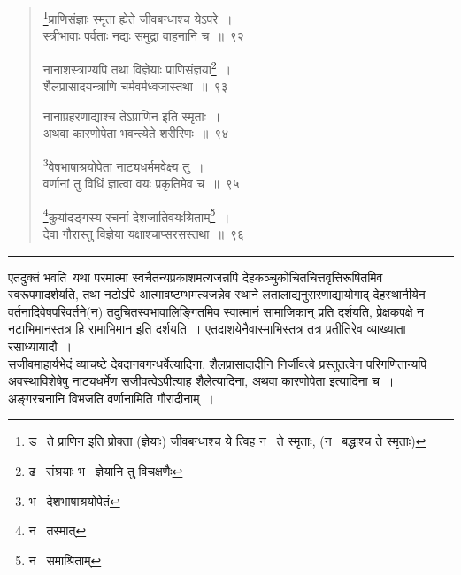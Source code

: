\documentclass[11pt, openany]{book}
\begin{document}
\newpage

\begin{quote}
{\na \renewcommand{\thefootnote}{1}\footnote{ड \textendash\ ते प्राणिन इति प्रोक्ता (ज्ञेयाः) जीवबन्धाश्च ये त्विह न \textendash\ ते स्मृताः, (न \textendash\ बद्धाश्च ते स्मृताः)}प्राणिसंज्ञाः स्मृता ह्येते जीवबन्धाश्च येऽपरे~।\\
स्त्रीभावाः पर्वताः नद्यः समुद्रा वाहनानि च~॥~९२

नानाशस्त्राण्यपि तथा विज्ञेयाः प्राणिसंज्ञया\renewcommand{\thefootnote}{2}\footnote{ढ \textendash\ संश्रयाः भ \textendash\ ज्ञेयानि तु विचक्षणैः}~।\\
शैलप्रासादयन्त्राणि चर्मवर्मध्वजास्तथा~॥~९३

नानाप्रहरणाद्याश्च तेऽप्राणिन इति स्मृताः~।\\
अथवा कारणोपेता भवन्त्येते शरीरिणः~॥~९४

\renewcommand{\thefootnote}{3}\footnote{भ \textendash\ देशभाषाश्रयोपेतं}वेषभाषाश्रयोपेता नाट्यधर्ममवेक्ष्य तु~।\\
वर्णानां तु विधिं ज्ञात्वा वयः प्रकृतिमेव च~॥~९५

\renewcommand{\thefootnote}{4}\footnote{न \textendash\ तस्मात्}कुर्यादङ्गस्य रचनां देशजातिवयःश्रिताम्\renewcommand{\thefootnote}{5}\footnote{न \textendash\ समाश्रिताम्}~।\\
देवा गौरास्तु विज्ञेया यक्षाश्चाप्सरसस्तथा~॥~९६}
\end{quote}

\hrule

\vspace{2mm}
एतदुक्तं भवति\textendash\ यथा परमात्मा स्वचैतन्यप्रकाशमत्यजन्नपि देहकञ्चुकोचितचित्तवृत्तिरूषितमिव स्वरूपमादर्शयति, तथा नटोऽपि आत्मावष्टम्भमत्यजन्नेव स्थाने लतालाद्यनुसरणाद्यायोगाद् देहस्थानीयेन वर्तनादिवेषपरिवर्तने(न) तदुचितस्वभावालिङ्गितमिव स्वात्मानं सामाजिकान् प्रति दर्शयति, प्रेक्षकपक्षे न नटाभिमानस्तत्र हि रामाभिमान इति दर्शयति~। एतदाशयेनैवास्माभिस्तत्र तत्र प्रतीतिरेव व्याख्याता रसाध्यायादौ~।\\

सजीवमाहार्यभेदं व्याचष्टे देवदानवगन्धर्वेत्यादिना, शैलप्रासादादीनि निर्जीवत्वे प्रस्तुतत्वेन परिगणितान्यपि अवस्थाविशेषेषु नाट्यधर्मेण सजीवत्वेऽपीत्याह \underline{शैले}त्यादिना, अथवा कारणोपेता इत्यादिना च~।\\

अङ्गरचनानि विभजति वर्णानामिति गौरादीनाम्~।

\newpage
\end{document}
